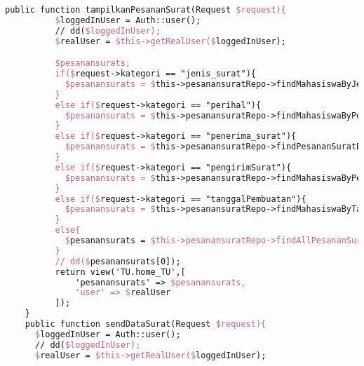 \begin{lstlisting}[language=tex,basicstyle=\tiny,caption=PesanansuratController.php]
    public function tampilkanPesananSurat(Request $request){
          $loggedInUser = Auth::user();
          // dd($loggedInUser);
          $realUser = $this->getRealUser($loggedInUser);

          $pesanansurats;
          if($request->kategori == "jenis_surat"){
            $pesanansurats = $this->pesanansuratRepo->findMahasiswaByJenisSurat($request->searchBox);
          }
          else if($request->kategori == "perihal"){
            $pesanansurats = $this->pesanansuratRepo->findMahasiswaByPerihal($request->searchBox);
          }
          else if($request->kategori == "penerima_surat"){
            $pesanansurats = $this->pesanansuratRepo->findPesananSuratByPenerimaSurat($request->searchBox);
          }
          else if($request->kategori == "pengirimSurat"){
            $pesanansurats = $this->pesanansuratRepo->findMahasiswaByPengirimSurat($request->searchBox);
          }
          else if($request->kategori == "tanggalPembuatan"){
            $pesanansurats = $this->pesanansuratRepo->findMahasiswaByTanggalPembuatan($request->searchBox);
          }
          else{
            $pesanansurats = $this->pesanansuratRepo->findAllPesananSurat();
          }
          // dd($pesanansurats[0]);
          return view('TU.home_TU',[
              'pesanansurats' => $pesanansurats,
              'user' => $realUser
          ]);
  	}
    public function sendDataSurat(Request $request){
      $loggedInUser = Auth::user();
      // dd($loggedInUser);
      $realUser = $this->getRealUser($loggedInUser);


\end{lstlisting}
